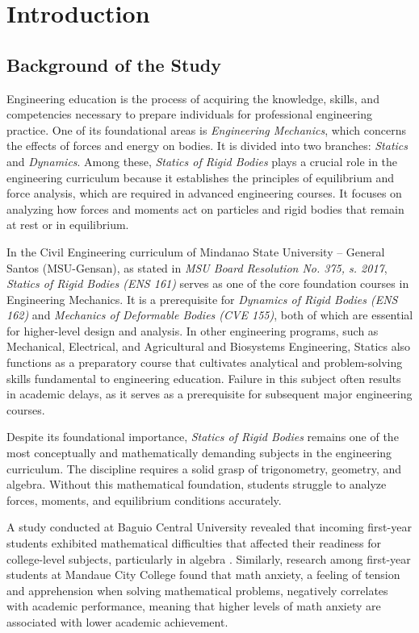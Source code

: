 \chapter{Introduction}\label{ch:1}

\section{Background of the Study}\label{sec:1-bos}

Engineering education is the process of acquiring the knowledge, skills, and competencies necessary to prepare individuals for professional engineering practice. One of its foundational areas is \textit{Engineering Mechanics}, which concerns the effects of forces and energy on bodies. It is divided into two branches: \textit{Statics} and \textit{Dynamics}. Among these, \textit{Statics of Rigid Bodies} plays a crucial role in the engineering curriculum because it establishes the principles of equilibrium and force analysis, which are required in advanced engineering courses. It focuses on analyzing how forces and moments act on particles and rigid bodies that remain at rest or in equilibrium. 

In the Civil Engineering curriculum of Mindanao State University – General Santos (MSU-Gensan), as stated in \textit{MSU Board Resolution No. 375, s. 2017}, \textit{Statics of Rigid Bodies (ENS 161)} serves as one of the core foundation courses in Engineering Mechanics. It is a prerequisite for \textit{Dynamics of Rigid Bodies (ENS 162)} and \textit{Mechanics of Deformable Bodies (CVE 155)}, both of which are essential for higher-level design and analysis. In other engineering programs, such as Mechanical, Electrical, and Agricultural and Biosystems Engineering, Statics also functions as a preparatory course that cultivates analytical and problem-solving skills fundamental to engineering education. Failure in this subject often results in academic delays, as it serves as a prerequisite for subsequent major engineering courses. \autocite{salami_challenges_2025}

Despite its foundational importance, \textit{Statics of Rigid Bodies} remains one of the most conceptually and mathematically demanding subjects in the engineering curriculum. The discipline requires a solid grasp of trigonometry, geometry, and algebra. Without this mathematical foundation, students struggle to analyze forces, moments, and equilibrium conditions accurately. 

A study conducted at Baguio Central University revealed that incoming first-year students exhibited mathematical difficulties that affected their readiness for college-level subjects, particularly in algebra \autocite{felix_analyzing_2023}. Similarly, research among first-year students at Mandaue City College found that math anxiety, a feeling of tension and apprehension when solving mathematical problems, negatively correlates with academic performance, meaning that higher levels of math anxiety are associated with lower academic achievement. \autocite{incierto_mathematics_nodate}

